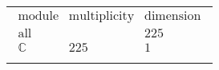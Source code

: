 \documentclass[crop,border=2mm]{standalone}
\begin{document}
\begin{tabular}{l}
$\displaystyle
\begin{array}{rll}
	\text{module}&\text{multiplicity}&\text{dimension} \\ \hline \text{all}&&225 \\
	\mathbb{C}&225&1
\end{array}
$ \\ \\

\end{tabular}
\end{document}
